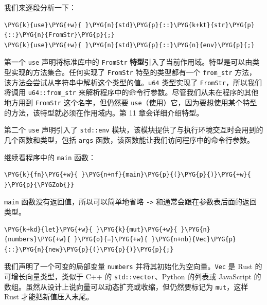 我们来逐段分析一下：

\begin{Verbatim}[commandchars=\\\{\},breaklines=true,breakanywhere=true,fontsize=\codefont,xleftmargin=17bp]
\PYG{k}{use}\PYG{+w}{ }\PYG{n}{std}\PYG{p}{::}\PYG{k+kt}{str}\PYG{p}{::}\PYG{n}{FromStr}\PYG{p}{;}
\PYG{k}{use}\PYG{+w}{ }\PYG{n}{std}\PYG{p}{::}\PYG{n}{env}\PYG{p}{;}
\end{Verbatim}

第一个 \texttt{use} 声明将标准库中的 \texttt{FromStr} \textbf{特型}引入了当前作用域。特型是可以由类型实现的方法集合。任何实现了 \texttt{FromStr} 特型的类型都有一个 \texttt{from\_str} 方法，该方法会尝试从字符串中解析这个类型的值。\texttt{u64} 类型实现了 \texttt{FromStr}，所以我们将调用 \texttt{u64::from\_str} 来解析程序中的命令行参数。尽管我们从未在程序的其他地方用到 \texttt{FromStr} 这个名字，但仍然要 \texttt{use}（使用）它，因为要想使用某个特型的方法，该特型就必须在作用域内。第 11 章会详细介绍特型。

第二个 \texttt{use} 声明引入了 \texttt{std::env} 模块，该模块提供了与执行环境交互时会用到的几个函数和类型，包括 \texttt{args} 函数，该函数能让我们访问程序中的命令行参数。

继续看程序中的 \texttt{main} 函数：

\begin{Verbatim}[commandchars=\\\{\},breaklines=true,breakanywhere=true,fontsize=\codefont,xleftmargin=17bp]
\PYG{k}{fn}\PYG{+w}{ }\PYG{n+nf}{main}\PYG{p}{(}\PYG{p}{)}\PYG{+w}{ }\PYG{p}{\PYGZob{}}
\end{Verbatim}

\texttt{main} 函数没有返回值，所以可以简单地省略 \texttt{->} 和通常会跟在参数表后面的返回类型。

\begin{Verbatim}[commandchars=\\\{\},breaklines=true,breakanywhere=true,fontsize=\codefont,xleftmargin=17bp]
\PYG{k+kd}{let}\PYG{+w}{ }\PYG{k}{mut}\PYG{+w}{ }\PYG{n}{numbers}\PYG{+w}{ }\PYG{o}{=}\PYG{+w}{ }\PYG{n+nb}{Vec}\PYG{p}{::}\PYG{n}{new}\PYG{p}{(}\PYG{p}{)}\PYG{p}{;}
\end{Verbatim}

我们声明了一个可变的局部变量 \texttt{numbers} 并将其初始化为空向量。\texttt{Vec} 是 Rust 的可增长向量类型，类似于 C++ 的 \texttt{std::vector}、Python 的列表或 JavaScript 的数组。虽然从设计上说向量可以动态扩充或收缩，但仍然要标记为 \texttt{mut}，这样 Rust 才能把新值压入末尾。

